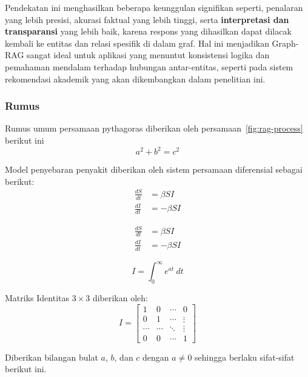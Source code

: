 Pendekatan ini menghasilkan beberapa keunggulan signifikan seperti, penalaran yang lebih presisi, akurasi faktual yang lebih tinggi, serta \textbf{interpretasi dan transparansi} yang lebih baik, karena respons yang dihasilkan dapat dilacak kembali ke entitas dan relasi spesifik di dalam graf. Hal ini menjadikan Graph-RAG sangat ideal untuk aplikasi yang menuntut konsistensi logika dan pemahaman mendalam terhadap hubungan antar-entitas, seperti pada sistem rekomendasi akademik yang akan dikembangkan dalam penelitian ini.
		
\subsubsection{Rumus}
	Rumus umum persamaan pythagoras diberikan oleh persamaan~\ref{fig:rag-process} berikut ini
\begin{equation}
	a^2 + b^2 = c^2 \label{eq:pythagoras}
\end{equation}
		
Model penyebaran penyakit diberikan oleh sistem persamaan diferensial sebagai berikut:
	\begin{align}
		\frac{dS}{dt} &= \beta S I\\
		\nonumber \frac{dI}{dt} &= -\beta S I
	\end{align}
		
	\begin{equation}
		\begin{aligned}
			\frac{dS}{dt} &= \beta S I\\
			\frac{dI}{dt} &= -\beta S I
		\end{aligned}
	\end{equation}
		
	\begin{equation}
		I = \int_0^{\infty} e^{at}~{dt}
	\end{equation}
		
Matriks Identitas $3 \times 3$ diberikan oleh:
	\begin{equation}
		I = \begin{bmatrix}
			1 & 0 & \cdots & 0\\
			0 & 1 & \cdots & \vdots\\
			\cdots & \cdots & \ddots &\vdots\\
			0 & 0 & \cdots & 1
		\end{bmatrix}
	\end{equation}
		
	\begin{theorem}
		Diberikan bilangan bulat  $a$, $b$, dan $c$ dengan $a \neq 0$ sehingga berlaku sifat-sifat berikut ini.
	\end{theorem}
		
